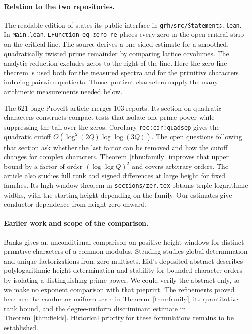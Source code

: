 \documentclass[11pt]{article}
\begin{document}
\paragraph{Relation to the two repositories.}
The readable edition of \cite{lean} states its public interface in
\texttt{grh/src/Statements.lean}. In \texttt{Main.lean},
\texttt{LFunction\_eq\_zero\_re} places every zero in the open critical
strip on the critical line. The source derives a one-sided estimate for a
smoothed, quadratically twisted prime remainder by comparing lattice
covolumes. The analytic reduction excludes zeros to the right of the line.
Here the zero-line theorem is used both for the measured spectra and for
the primitive characters inducing pairwise quotients. Those quotient
characters supply the many arithmetic measurements needed below.

The 621-page ProveIt article \cite{article} merges 103 reports. Its section
on quadratic characters constructs compact tests that isolate one prime
power while suppressing the tail over the zeros. Corollary
\texttt{rec:cor:quadsep} gives the quadratic cutoff
$O(\log^2(2Q)\log\log(3Q))$. The open questions following that section ask
whether the last factor can be removed and how the cutoff changes for complex
characters. Theorem~\ref{thm:family} improves that upper bound by a factor
of order $(\log\log Q)^2$ and covers arbitrary orders. The
article also studies full rank and signed differences at large height for
fixed families. Its high-window theorem in \texttt{sections/zer.tex}
obtains triple-logarithmic widths, with the starting height depending on
the family. Our estimates give conductor dependence from height zero onward.

\paragraph{Earlier work and scope of the comparison.}
Banks \cite{banks} gives an unconditional comparison on positive-height
windows for distinct primitive characters of a common modulus.
Steuding \cite{steuding} studies global determination and unique
factorizations from zero multisets. Eid's deposited abstract \cite{eid}
describes polylogarithmic-height determination and stability for bounded
character orders by isolating a distinguishing prime power. We could verify
the abstract only, so we make no exponent comparison with that preprint.
The refinements proved here are the conductor-uniform scale in
Theorem~\ref{thm:family}, its quantitative rank bound, and the
degree-uniform discriminant estimate in Theorem~\ref{thm:fields}.
Historical priority for these formulations remains to be established.
\end{document}
